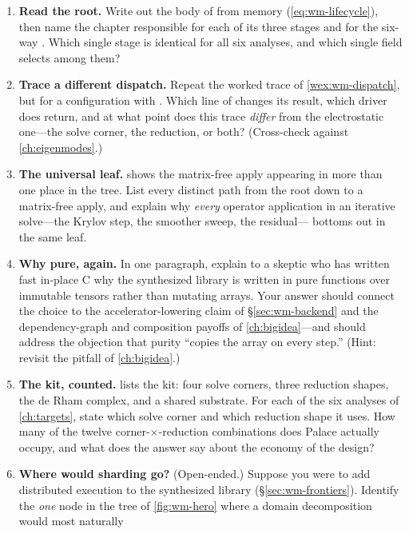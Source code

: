 \exercisessection
\begin{enumerate}[nosep]
  \item \textbf{Read the root.} Write out the body of  from memory
  (\cref{eq:wm-lifecycle}), then name the chapter responsible for each of its three stages
  and for the six-way . Which single stage is identical for all six
  analyses, and which single field selects among them?
  \item \textbf{Trace a different dispatch.} Repeat the worked trace of
  \cref{wex:wm-dispatch}, but for a configuration with .
  Which line of  changes its result, which driver does 
  return, and at what point does this trace \emph{differ} from the electrostatic one---the
  solve corner, the reduction, or both? (Cross-check against \cref{ch:eigenmodes}.)
  \item \textbf{The universal leaf.}  shows the matrix-free apply
  appearing in more than one place in the tree. List every distinct path from the root
   down to a matrix-free apply, and explain why \emph{every} operator
  application in an iterative solve---the Krylov step, the smoother sweep, the residual---
  bottoms out in the same leaf.
  \item \textbf{Why pure, again.} In one paragraph, explain to a skeptic who has written
  fast in-place C why the synthesized library is written in pure functions over immutable
  tensors rather than mutating arrays. Your answer should connect the choice to the
  accelerator-lowering claim of \S\ref{sec:wm-backend} and the dependency-graph and
  composition payoffs of \cref{ch:bigidea}---and should address the objection that purity
  ``copies the array on every step.'' (Hint: revisit the pitfall of \cref{ch:bigidea}.)
  \item \textbf{The kit, counted.}  lists the kit: four solve corners,
  three reduction shapes, the de Rham complex, and a shared substrate. For each of the six
  analyses of \cref{ch:targets}, state which solve corner and which reduction shape it uses.
  How many of the twelve corner-$\times$-reduction combinations does Palace actually
  occupy, and what does the answer say about the economy of the design?
  \item \textbf{Where would sharding go?} (Open-ended.) Suppose you were to add distributed
  execution to the synthesized library (\S\ref{sec:wm-frontiers}). Identify the \emph{one}
  node in the tree of \cref{fig:wm-hero} where a domain decomposition would most naturally

\end{enumerate}
